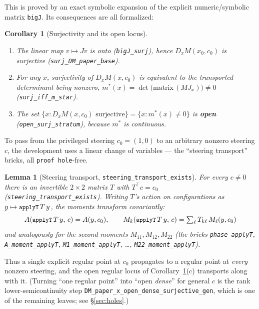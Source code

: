 \documentclass[11pt]{article}
\theoremstyle{plain}
\newtheorem{lemma}[theorem]{Lemma}
\newtheorem{corollary}[theorem]{Corollary}
\theoremstyle{definition}
\theoremstyle{remark}
\newcommand{\code}[1]{\texttt{\small #1}}
\begin{document}
This is proved by an exact symbolic expansion of the explicit numeric/symbolic
matrix \code{bigJ}.  Its consequences are all formalized:

\begin{corollary}[Surjectivity and its open locus]\label{cor:surj}
\begin{enumerate}[label=(\alph*),leftmargin=2em]
\item The linear map $v\mapsto Jv$ is onto (\code{bigJ\_surj}), hence
  $D_xM(x_0,c_0)$ is surjective (\code{surj\_DM\_paper\_base}).
\item For any $x$, surjectivity of $D_xM(x,c_0)$ is equivalent to the
  transported determinant being nonzero, $m^\ast(x)=\det\big(\mathrm{matrix}\,(MJ_x)\big)\ne0$
  (\code{surj\_iff\_m\_star}).
\item The set $\{x:D_xM(x,c_0)\text{ surjective}\}=\{x:m^\ast(x)\ne0\}$ is
  \textbf{open} (\code{open\_surj\_stratum}), because $m^\ast$ is continuous.
\end{enumerate}
\end{corollary}

To pass from the privileged steering $c_0=(1,0)$ to an arbitrary nonzero
steering $c$, the development uses a linear change of variables --- the
``steering transport'' bricks, all \code{proof hole}-free.

\begin{lemma}[Steering transport, \code{steering\_transport\_exists}]
For every $c\ne0$ there is an invertible $2\times2$ matrix $T$ with
$T^{\!\top}c=c_0$ (\code{steering\_transport\_exists}).  Writing $T$'s action on
configurations as $y\mapsto\code{applyT}\,T\,y$, the moments transform
covariantly:
\[
  A(\code{applyT}\,T\,y,\,c)=A(y,c_0),\qquad
  M_k(\code{applyT}\,T\,y,\,c)=\textstyle\sum_\ell T_{k\ell}\,M_\ell(y,c_0)
\]
and analogously for the second moments $M_{11},M_{12},M_{22}$ (the bricks
\code{phase\_applyT}, \code{A\_moment\_applyT}, \code{M1\_moment\_applyT},
\dots, \code{M22\_moment\_applyT}).
\end{lemma}

Thus a single explicit regular point at $c_0$ propagates to a regular point at
\emph{every} nonzero steering, and the open regular locus of
Corollary~\ref{cor:surj}(c) transports along with it.  (Turning ``one regular
point'' into ``open \emph{dense}'' for general $c$ is the rank lower-semicontinuity
step \code{DM\_paper\_x\_open\_dense\_surjective\_gen}, which is one of the
remaining leaves; see \S\ref{sec:holes}.)

\end{document}
